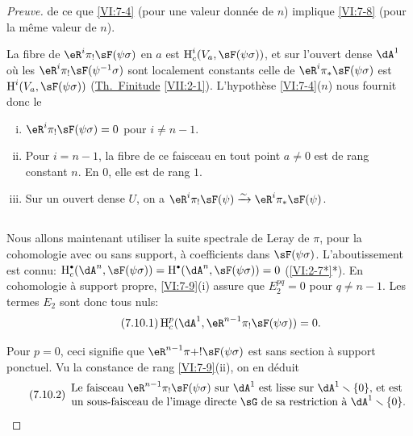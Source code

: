 \begin{proof}[Preuve]
de ce que \ref{VI:7-4} (pour une valeur donnée de $n$) implique \ref{VI:7-8} 
(pour la même valeur de $n$). 

La fibre de $\eR^i \pi_! \sF(\psi\sigma)$ en $a$ est 
$\h_c^i(V_a,\sF(\psi\sigma))$, et sur l'ouvert dense $\dA^1$ où les 
$\eR^i \pi_!\sF(\psi^{-1}\sigma)$ sont localement constants celle de 
$\eR^i \pi_\ast \sF(\psi\sigma)$ est $\h^i(V_a,\sF(\psi\sigma))$ 
(\hyperref[VII]{Th.\ Finitude} \ref{VII:2-1}). L'hypothèse \ref{VI:7-4}($n$) 
nous fournit donc le 





\begin{lemma_}\label{VI:7-9}
\begin{enumerate}[(i)]
  \item $\eR^i \pi_! \sF(\psi\sigma)=0$ pour $i\ne n-1$. 
  \item Pour $i=n-1$, la fibre de ce faisceau en tout point $a\ne 0$ est de rang 
    constant $n$. En $0$, elle est de rang $1$. 
  \item Sur un ouvert dense $U$, on a 
    $\eR^i \pi_! \sF(\psi) \iso \eR^i \pi_\ast \sF(\psi)$. 
\end{enumerate}
\end{lemma_}





\subsection{}\label{VI:7-10}

Nous allons maintenant utiliser la suite spectrale de Leray de $\pi$, pour la 
cohomologie avec ou sans support, à coefficients dans $\sF(\psi\sigma)$. 
L'aboutissement est connu: 
$\h_c^\bullet(\dA^n,\sF(\psi\sigma))=\h^\bullet(\dA^n,\sF(\psi\sigma)) = 0$ 
(\ref{VI:2-7*}*). En cohomologie à support propre, \ref{VI:7-9}(i) assure que 
$E_2^{pq}=0$ pour $q\ne n-1$. Les termes $E_2$ sont donc tous nuls: 
\begin{equation*}\tag{7.10.1}\label{VI:eq:7-10-1}
  \h_c^p(\dA^1,\eR^{n-1} \pi_!\sF(\psi\sigma)) = 0 \text{.} 
\end{equation*}

Pour $p=0$, ceci signifie que $\eR^{n-1}\pi+! \sF(\psi\sigma)$ est sans section 
à support ponctuel. Vu la constance de rang \ref{VI:7-9}(ii), on en déduit 
\begin{equation*}\tag{7.10.2}\label{VI:eq:7-10-2}
  \begin{array}{c}
    \text{Le faisceau $\eR^{n-1} \pi_! \sF(\psi\sigma)$ sur $\dA^1$ est lisse sur $\dA^1\setminus \{0\}$, et est } \\ 
    \text{un sous-faisceau de l'image directe $\sG$ de sa restriction à $\dA^1\setminus \{0\}$.}
  \end{array}
\end{equation*}


\end{proof}
